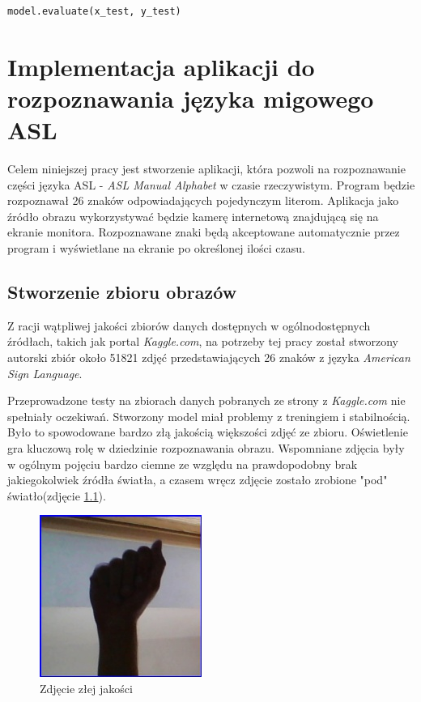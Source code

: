 \documentclass[a4paper,12pt,oneside]{book} %
\begin{document}
\begin{lstlisting}[language=Python, caption={Ewaluacja modelu \cite{mnistapp}}, label={lst:mnisteval}]
	model.evaluate(x_test, y_test)
\end{lstlisting}


\chapter{Implementacja aplikacji do rozpoznawania języka migowego ASL}

Celem niniejszej pracy jest stworzenie aplikacji, która pozwoli na rozpoznawanie części języka ASL - \emph{ASL Manual Alphabet} w czasie rzeczywistym. Program będzie rozpoznawał 26 znaków odpowiadających pojedynczym literom. Aplikacja jako źródło obrazu wykorzystywać będzie kamerę internetową znajdującą się na ekranie monitora. Rozpoznawane znaki będą akceptowane automatycznie przez program i wyświetlane na ekranie po określonej ilości czasu.

\section{Stworzenie zbioru obrazów}

Z racji wątpliwej jakości zbiorów danych dostępnych w ogólnodostępnych źródłach, takich jak portal \emph{Kaggle.com}, na potrzeby tej pracy został stworzony autorski zbiór około 51821 zdjęć przedstawiających 26 znaków z języka \emph{American Sign Language}.

Przeprowadzone testy na zbiorach danych pobranych ze strony z \emph{Kaggle.com} nie spełniały oczekiwań. Stworzony model miał problemy z treningiem i stabilnością. Było to spowodowane bardzo złą jakością większości zdjęć ze zbioru. Oświetlenie gra kluczową rolę w dziedzinie rozpoznawania obrazu. Wspomniane zdjęcia były w ogólnym pojęciu bardzo ciemne ze względu na prawdopodobny brak jakiegokolwiek źródła światła, a czasem wręcz zdjęcie zostało zrobione "pod" światło(zdjęcie \ref{asl_bad_photo}). 

\begin{figure}[h]
	\centering
	\includegraphics[scale=0.6]{asl_bad_photo.jpg}
	\caption{Zdjęcie złej jakości}
	\label{asl_bad_photo}
\end{figure}
\end{document}
